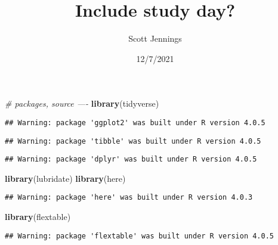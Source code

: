 \documentclass[
]{article}
\title{Include study day?}
\author{Scott Jennings}
\date{12/7/2021}
\newenvironment{Shaded}{\begin{snugshade}}{\end{snugshade}}
\newcommand{\CommentTok}[1]{\textcolor[rgb]{0.56,0.35,0.01}{\textit{#1}}}
\newcommand{\KeywordTok}[1]{\textcolor[rgb]{0.13,0.29,0.53}{\textbf{#1}}}
\newcommand{\NormalTok}[1]{#1}
\begin{document}
\maketitle

\begin{Shaded}
\begin{Highlighting}[]
\CommentTok{# packages, source ----}
\KeywordTok{library}\NormalTok{(tidyverse)}
\end{Highlighting}
\end{Shaded}

\begin{verbatim}
## Warning: package 'ggplot2' was built under R version 4.0.5
\end{verbatim}

\begin{verbatim}
## Warning: package 'tibble' was built under R version 4.0.5
\end{verbatim}

\begin{verbatim}
## Warning: package 'dplyr' was built under R version 4.0.5
\end{verbatim}

\begin{Shaded}
\begin{Highlighting}[]
\KeywordTok{library}\NormalTok{(lubridate)}
\KeywordTok{library}\NormalTok{(here)}
\end{Highlighting}
\end{Shaded}

\begin{verbatim}
## Warning: package 'here' was built under R version 4.0.3
\end{verbatim}

\begin{Shaded}
\begin{Highlighting}[]
\KeywordTok{library}\NormalTok{(flextable)}
\end{Highlighting}
\end{Shaded}

\begin{verbatim}
## Warning: package 'flextable' was built under R version 4.0.5
\end{verbatim}
\end{document}
